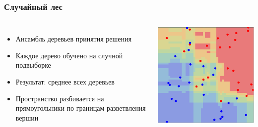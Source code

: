 \documentclass{beamer}
\begin{document}
\begin{frame} \frametitle{Случайный лес}
    \begin{columns}
            \begin{itemize}
                \item Ансамбль деревьев принятия решения
                \item Каждое дерево обучено на случной подвыборке
                \item Результат: среднее всех деревьев 
                \item Пространство разбивается на прямоугольники по границам разветвления вершин
            \end{itemize}
        \includegraphics[width=\textwidth]{random_forest.png}
    \end{columns}
\end{frame}
\end{document}
